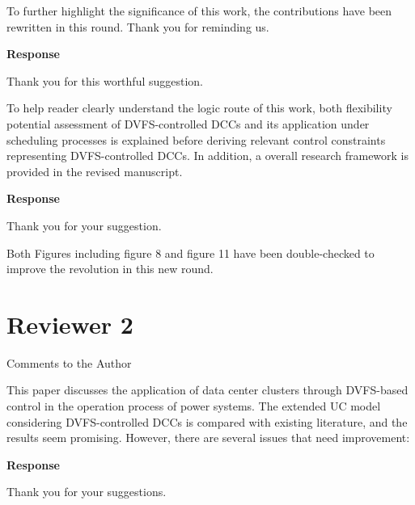 \documentclass[a4paper,twoside,11pt]{reviewresponse}
\begin{document}
To further highlight the significance of this work, the contributions have been rewritten in this round. Thank you for reminding us.


\textbf{Response}

Thank you for this worthful suggestion.

To help reader clearly understand the logic route of this work, both flexibility potential assessment of DVFS-controlled DCCs and its application under scheduling processes is explained before
deriving relevant control constraints representing DVFS-controlled DCCs. In addition, a overall research framework is provided in the revised manuscript.


\textbf{Response}

Thank you for your suggestion.

Both Figures including figure 8 and figure 11 have been double-checked to improve the revolution in this new round.

\clearpage

\section{Reviewer 2}

Comments to the Author

This paper discusses the application of data center clusters through DVFS-based control in the operation process of power systems. The extended UC model considering DVFS-controlled DCCs is compared with existing literature, and the results seem promising. However, there are several issues that need improvement:


\textbf{Response}

Thank you for your suggestions.
\end{document}
